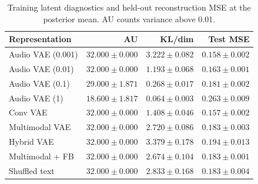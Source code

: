 \begin{table}[htbp]
\centering
\caption{Training latent diagnostics and held-out reconstruction MSE at the posterior mean. AU counts variance above 0.01.}
\label{tab:diagnostics}
\small
\begin{tabular}{lrrr}
\toprule
Representation & AU & KL/dim & Test MSE \\
\midrule
Audio VAE (0.001) & $32.000\pm0.000$ & $3.222\pm0.082$ & $0.158\pm0.002$ \\
Audio VAE (0.01) & $32.000\pm0.000$ & $1.193\pm0.068$ & $0.163\pm0.001$ \\
Audio VAE (0.1) & $29.000\pm1.871$ & $0.268\pm0.017$ & $0.181\pm0.002$ \\
Audio VAE (1) & $18.600\pm1.817$ & $0.064\pm0.003$ & $0.263\pm0.009$ \\
Conv VAE & $32.000\pm0.000$ & $1.408\pm0.046$ & $0.157\pm0.002$ \\
Multimodal VAE & $32.000\pm0.000$ & $2.720\pm0.086$ & $0.183\pm0.003$ \\
Hybrid VAE & $32.000\pm0.000$ & $3.379\pm0.178$ & $0.194\pm0.013$ \\
Multimodal + FB & $32.000\pm0.000$ & $2.674\pm0.104$ & $0.183\pm0.001$ \\
Shuffled text & $32.000\pm0.000$ & $2.833\pm0.168$ & $0.183\pm0.004$ \\
\bottomrule
\end{tabular}
\end{table}
